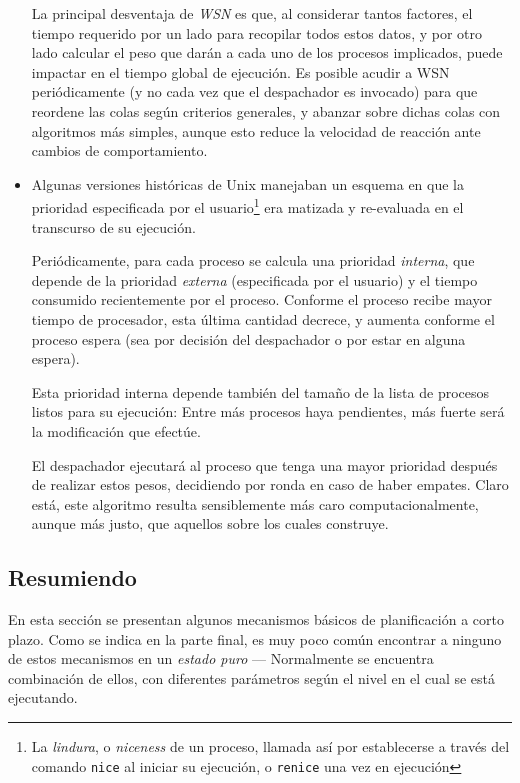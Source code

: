 \documentclass[11pt,fleqn]{book} %
\begin{document}
\begin{itemize}
  La principal desventaja de \emph{WSN} es que, al considerar tantos
  factores, el tiempo requerido por un lado para recopilar todos estos
  datos, y por otro lado calcular el peso que darán a cada uno de los
  procesos implicados, puede impactar en el tiempo global de
  ejecución. Es posible acudir a WSN periódicamente (y no cada vez que
  el despachador es invocado) para que reordene las colas según
  criterios generales, y abanzar sobre dichas colas con algoritmos más
  simples, aunque esto reduce la velocidad de reacción ante cambios de
  comportamiento.
\item Algunas versiones históricas de Unix manejaban un esquema en que la
  prioridad especificada por el usuario\footnote{La \emph{lindura}, o
  \emph{niceness} de un proceso, llamada así por establecerse a través del
  comando \texttt{nice} al iniciar su ejecución, o \texttt{renice} una vez en
  ejecución } era matizada y re-evaluada en el transcurso de su
  ejecución.

  Periódicamente, para cada proceso se calcula una prioridad
  \emph{interna}, que depende de la prioridad \emph{externa} (especificada por
  el usuario) y el tiempo consumido recientemente por el
  proceso. Conforme el proceso recibe mayor tiempo de procesador, esta
  última cantidad decrece, y aumenta conforme el proceso espera (sea
  por decisión del despachador o por estar en alguna espera).

  Esta prioridad interna depende también del tamaño de la lista de
  procesos listos para su ejecución: Entre más procesos haya
  pendientes, más fuerte será la modificación que efectúe.

  El despachador ejecutará al proceso que tenga una mayor prioridad
  después de realizar estos pesos, decidiendo por ronda en caso de
  haber empates. Claro está, este algoritmo resulta sensiblemente más
  caro computacionalmente, aunque más justo, que aquellos sobre los
  cuales construye.
\end{itemize}
\subsection{Resumiendo}
\label{sec-4-2-9}
\label{PLAN_resumen_algoritmos}


En esta sección se presentan algunos mecanismos básicos de
planificación a corto plazo. Como se indica en la parte final, es muy
poco común encontrar a ninguno de estos mecanismos en un \emph{estado puro}
— Normalmente se encuentra combinación de ellos, con diferentes
parámetros según el nivel en el cual se está ejecutando.
\end{document}
